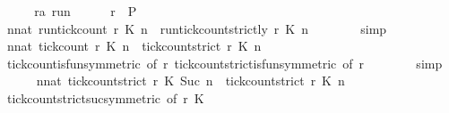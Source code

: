 \begin{isabellebody}
%
\isadelimproof
%
\endisadelimproof
%
\isatagproof
{}\isamarkupfalse%
\isanewline
\ \ \isacommand{{\isacharbraceleft}}\isamarkupfalse%
\ \isamarkupfalse%
\ r{\isacharcolon}{\isacharcolon}{\isacartoucheopen}{\isacharprime}a\ run{\isacartoucheclose}\isanewline
\ \ \ \ \isamarkupfalse%
\ {\isacartoucheopen}r\ {\isasymin}\ {\isacharquery}P{\isacartoucheclose}\isanewline
\ \ \ \ \isamarkupfalse%
\ {\isacartoucheopen}{\isasymforall}n{\isacharcolon}{\isacharcolon}nat{\isachardot}\ {\isacharparenleft}run{\isacharunderscore}tick{\isacharunderscore}count\ r\ K\ n{\isacharparenright}\ {\isasymle}\ {\isacharparenleft}run{\isacharunderscore}tick{\isacharunderscore}count{\isacharunderscore}strictly\ r\ K\ n{\isacharparenright}{\isacartoucheclose}\isanewline
\ \ \ \ \ \ \isamarkupfalse%
\ simp\isanewline
\ \ \ \ \isamarkupfalse%
\ {}{\isacharcolon}{\isacartoucheopen}{\isasymforall}n{\isacharcolon}{\isacharcolon}nat{\isachardot}\ {\isacharparenleft}tick{\isacharunderscore}count\ r\ K\ n{\isacharparenright}\ {\isasymle}\ {\isacharparenleft}tick{\isacharunderscore}count{\isacharunderscore}strict\ r\ K\ n{\isacharparenright}{\isacartoucheclose}\isanewline
\ \ \ \ \ \ \isamarkupfalse%
\ tick{\isacharunderscore}count{\isacharunderscore}is{\isacharunderscore}fun{\isacharbrackleft}symmetric{\isacharcomma}\ of\ r{\isacharbrackright}\ tick{\isacharunderscore}count{\isacharunderscore}strict{\isacharunderscore}is{\isacharunderscore}fun{\isacharbrackleft}symmetric{\isacharcomma}\ of\ r{\isacharbrackright}\isanewline
\ \ \ \ \ \ \isamarkupfalse%
\ simp\isanewline
\ \ \ \ \isamarkupfalse%
\ {\isacartoucheopen}{\isasymforall}n{\isacharcolon}{\isacharcolon}nat{\isachardot}\ {\isacharparenleft}tick{\isacharunderscore}count{\isacharunderscore}strict\ r\ K\ {\isacharparenleft}Suc\ n{\isacharparenright}{\isacharparenright}\ {\isasymle}\ {\isacharparenleft}tick{\isacharunderscore}count{\isacharunderscore}strict\ r\ K\ n{\isacharparenright}{\isacartoucheclose}\isanewline
\ \ \ \ \ \ \isamarkupfalse%
\ tick{\isacharunderscore}count{\isacharunderscore}strict{\isacharunderscore}suc{\isacharbrackleft}symmetric{\isacharcomma}\ of\ {\isacartoucheopen}r{\isacartoucheclose}\ {\isacartoucheopen}K\ \isamarkupfalse%

\end{isabellebody}
